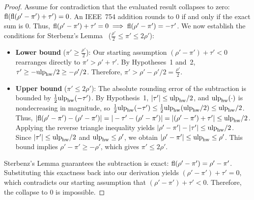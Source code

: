 \begin{proof}
Assume for contradiction that the evaluated result collapses to zero: $\mathrm{fl}(\mathrm{fl}(\rho' - \pi') + \tau') = 0$.
An IEEE~754 addition rounds to $0$ if and only if the exact sum is $0$.
Thus, $\mathrm{fl}(\rho' - \pi') + \tau' = 0 \implies \mathrm{fl}(\rho' - \pi') = -\tau'$.
We now establish the conditions for Sterbenz's Lemma~\citep{sterbenz1974floating} ($\frac{\rho'}{2} \le \pi' \le 2\rho'$):

\begin{itemize}
\item \textbf{Lower bound} ($\pi' \ge \frac{\rho'}{2}$): 
Our starting assumption $(\rho' - \pi') + \tau' < 0$ rearranges directly to $\pi' > \rho' + \tau'$. By Hypotheses~1 and~2, $\tau' \ge -\mathrm{ulp}_{\rm hw}/2 \ge -\rho'/2$. Therefore, $\pi' > \rho' - \rho'/2 = \frac{\rho'}{2}$.

\item \textbf{Upper bound} ($\pi' \le 2\rho'$): 
The absolute rounding error of the subtraction is bounded by $\frac{1}{2}\mathrm{ulp}_{\rm hw}(-\tau')$. By Hypothesis~1, $|\tau'| \le \mathrm{ulp}_{\rm hw}/2$, and $\mathrm{ulp}_{\rm hw}(\cdot)$ is nondecreasing in magnitude, so $\frac{1}{2}\mathrm{ulp}_{\rm hw}(-\tau') \le \frac{1}{2}\mathrm{ulp}_{\rm hw}(\mathrm{ulp}_{\rm hw}/2) \le \mathrm{ulp}_{\rm hw}/2$. Thus, $|\mathrm{fl}(\rho' - \pi') - (\rho' - \pi')| = |-\tau' - (\rho' - \pi')| = |(\rho' - \pi') + \tau'| \le \mathrm{ulp}_{\rm hw}/2$. Applying the reverse triangle inequality yields $|\rho' - \pi'| - |\tau'| \le \mathrm{ulp}_{\rm hw}/2$. Since $|\tau'| \le \mathrm{ulp}_{\rm hw}/2$ and $\mathrm{ulp}_{\rm hw} \le \rho'$, we obtain $|\rho' - \pi'| \le \mathrm{ulp}_{\rm hw} \le \rho'$. This bound implies $\rho' - \pi' \ge -\rho'$, which gives $\pi' \le 2\rho'$.
\end{itemize}

Sterbenz's Lemma guarantees the subtraction is exact: $\mathrm{fl}(\rho' - \pi') = \rho' - \pi'$.
Substituting this exactness back into our derivation yields $(\rho' - \pi') + \tau' = 0$, which contradicts our starting assumption that $(\rho' - \pi') + \tau' < 0$. Therefore, the collapse to $0$ is impossible.
\end{proof}

